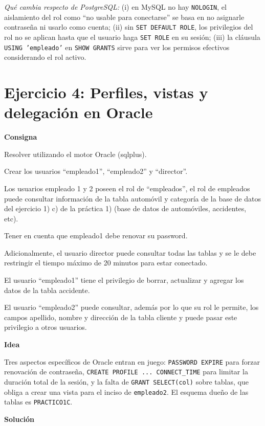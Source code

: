 \documentclass[11pt,a4paper]{article}
\newcommand{\itemcabecera}[1]{\noindent\textbf{#1}\par\medskip}
\newcommand{\bloqueConsigna}{\itemcabecera{Consigna}}
\newcommand{\bloqueIdea}{\itemcabecera{Idea}}
\newcommand{\bloqueSolucion}{\itemcabecera{Soluci\'on}}
\begin{document}
\textit{Qué cambia respecto de PostgreSQL:} (i) en MySQL no hay \texttt{NOLOGIN}, el aislamiento del rol como ``no usable para conectarse'' se basa en no asignarle contraseña ni usarlo como cuenta; (ii) sin \texttt{SET DEFAULT ROLE}, los privilegios del rol no se aplican hasta que el usuario haga \texttt{SET ROLE} en su sesión; (iii) la cláusula \texttt{USING 'empleado'} en \texttt{SHOW GRANTS} sirve para ver los permisos efectivos considerando el rol activo.

\section{Ejercicio 4: Perfiles, vistas y delegación en Oracle}

\bloqueConsigna

Resolver utilizando el motor Oracle (sqlplus).

Crear los usuarios ``empleado1'', ``empleado2'' y ``director''.

Los usuarios empleado 1 y 2 poseen el rol de ``empleados'', el rol de empleados puede consultar información de la tabla automóvil y categoría de la base de datos del ejercicio 1) c) de la práctica 1) (base de datos de automóviles, accidentes, etc).

Tener en cuenta que empleado1 debe renovar su password.

Adicionalmente, el usuario director puede consultar todas las tablas y se le debe restringir el tiempo máximo de 20 minutos para estar conectado.

El usuario ``empleado1'' tiene el privilegio de borrar, actualizar y agregar los datos de la tabla accidente.

El usuario ``empleado2'' puede consultar, además por lo que su rol le permite, los campos apellido, nombre y dirección de la tabla cliente y puede pasar este privilegio a otros usuarios.

\bloqueIdea

Tres aspectos específicos de Oracle entran en juego: \texttt{PASSWORD EXPIRE} para forzar renovación de contraseña, \texttt{CREATE PROFILE ... CONNECT\_TIME} para limitar la duración total de la sesión, y la falta de \texttt{GRANT SELECT(col)} sobre tablas, que obliga a crear una vista para el inciso de \texttt{empleado2}. El esquema dueño de las tablas es \texttt{PRACTICO1C}.

\bloqueSolucion
\end{document}
